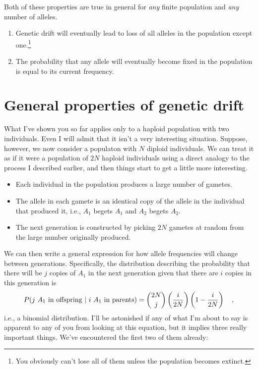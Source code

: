 Both of these properties are true in general for {\it any\/} finite
population and {\it any\/} number of alleles.

\begin{enumerate}

\item Genetic drift will eventually lead to loss of all alleles in the
population except one.\footnote{You obviously can't lose all of them
unless the population becomes extinct.}

\item The probability that any allele will eventually become fixed in
the population is equal to its current frequency.

\end{enumerate}

\section*{General properties of genetic drift}

What I've shown you so far applies only to a haploid population with
two individuals. Even I will admit that it isn't a very interesting
situation. Suppose, however, we now consider a populaton with $N$
diploid individuals. We can treat it as if it were a population of
$2N$ haploid individuals using a direct analogy to the process I
described earlier, and then things start to get a little more
interesting.

\begin{itemize}

\item Each individual in the population produces a large number of
gametes.

\item The allele in each gamete is an identical copy of the allele in
  the individual that produced it, i.e., $A_1$ begets $A_1$ and $A_2$
  begets $A_2$.

\item The next generation is constructed by picking $2N$ gametes at
  random from the large number originally produced.

\end{itemize}

We can then write a general expression for how allele frequencies will
change between generations. Specifically, the distribution
describing the probability that there will be $j$ copies of $A_1$ in
the next generation given that there are $i$ copies in this generation
is
\[
P(\hbox{$j$ $A_1$ in offspring $|$ $i$ $A_1$ in parents}) =
{2N \choose j}\left(\frac{i}{2N}\right)\left(1 - \frac{i}{2N}\right)
\quad ,
\]
i.e., a binomial distribution. I'll be astonished if any of what I'm about to say is
apparent to any of you from looking at this equation, but it
implies three really important things. We've encountered the first two
of them already:

